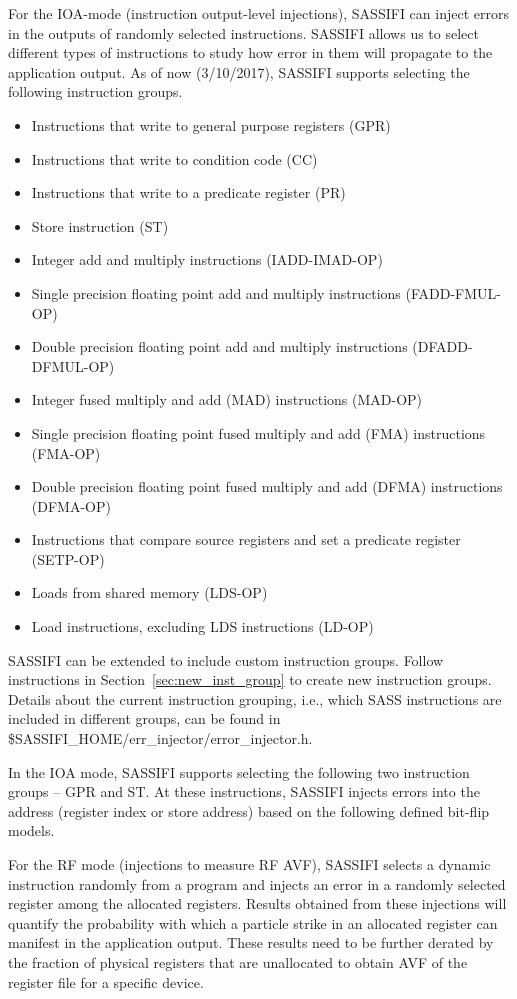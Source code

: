 For the IOA-mode (instruction output-level injections), SASSIFI can inject
errors in the outputs of randomly selected instructions. SASSIFI allows us to
select different types of instructions to study how error in them will
propagate to the application output. As of now (3/10/2017), SASSIFI supports
selecting the following instruction groups. 
\begin{itemize}
\item Instructions that write to general purpose registers (GPR) 
\item Instructions that write to condition code (CC) 
\item Instructions that write to a predicate register (PR) 
\item Store instruction (ST)
\item Integer add and multiply instructions (IADD-IMAD-OP)
\item Single precision floating point add and multiply instructions (FADD-FMUL-OP)
\item Double precision floating point add and multiply instructions (DFADD-DFMUL-OP)
\item Integer fused multiply and add (MAD) instructions (MAD-OP)
\item Single precision floating point fused multiply and add (FMA) instructions  (FMA-OP)
\item Double precision floating point fused multiply and add (DFMA) instructions  (DFMA-OP)
\item Instructions that compare source registers and set a predicate register (SETP-OP)
\item Loads from shared memory (LDS-OP)
\item Load instructions, excluding LDS instructions (LD-OP)
\end{itemize}

SASSIFI can be extended to include custom instruction groups. Follow
instructions in Section~\ref{sec:new_inst_group} to create new instruction
groups. Details about the current instruction grouping, i.e., which SASS
instructions are included in different groups, can be found in
\$SASSIFI\_HOME/err\_injector/error\_injector.h.

In the IOA mode, SASSIFI supports selecting the following two instruction
groups -- GPR and ST. At these instructions, SASSIFI injects errors into the
address (register index or store address) based on the following defined
bit-flip models. 


For the RF mode (injections to measure RF AVF), SASSIFI selects a dynamic
instruction randomly from a program and injects an error in a randomly selected
register among the allocated registers.  Results obtained from these injections
will quantify the probability with which a particle strike in an allocated
register can manifest in the application output.  These results need to be
further derated by the fraction of physical registers that are unallocated to
obtain AVF of the register file for a specific device. 


